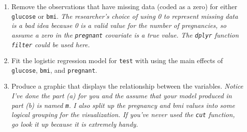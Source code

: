 \documentclass[]{book}
\theoremstyle{definition}
\theoremstyle{definition}
\theoremstyle{remark}
\begin{document}
\begin{enumerate}
  \begin{enumerate}
  \def\labelenumii{\alph{enumii}.}
  \item
    Remove the observations that have missing data (coded as a zero) for
    either \texttt{glucose} or \texttt{bmi}. \emph{The researcher's
    choice of using 0 to represent missing data is a bad idea because 0
    is a valid value for the number of pregnancies, so assume a zero in
    the \texttt{pregnant} covariate is a true value. The \texttt{dplyr}
    function \texttt{filter} could be used here.}
  \item
    Fit the logistic regression model for \texttt{test} with using the
    main effects of \texttt{glucose}, \texttt{bmi}, and
    \texttt{pregnant}.
  \item
    Produce a graphic that displays the relationship between the
    variables. \emph{Notice I've done the part (a) for you and the
    assume that your model produced in part (b) is named \texttt{m}. I
    also split up the pregnancy and bmi values into some logical
    grouping for the visualization. If you've never used the
    \texttt{cut} function, go look it up because it is extremely handy.}


\end{enumerate}
\end{enumerate}
\end{document}
